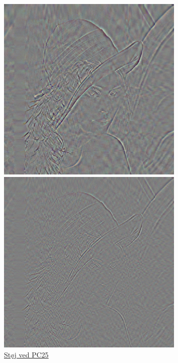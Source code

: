 \begin{figure}
\begin{minipage}[b]{0.31\linewidth}
\centering
\includegraphics[width=0.8\textwidth]{Billeder/fejlbilleder/fejlPC25.png}
\caption{\href{https://www.dropbox.com/home/P1\%20-\%20B205/vejleder/billeder/PCA/Fejlbilleder?preview=fejlPC25.png}{Støj ved PC25}}
\label{fig:noisePC25}
\end{minipage}
\hspace{0.2cm}
\begin{minipage}[b]{0.31\linewidth}
\centering
\includegraphics[width=0.8\textwidth]{Billeder/fejlbilleder/fejlPC50.png}

\end{minipage}
\end{figure}
